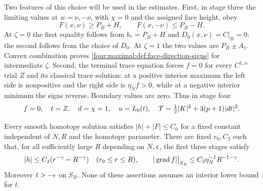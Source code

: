 Two features of this choice will be used in the estimates.
First, in stage three the limiting values at $w=\nu,-\nu$, with
$\chi=0$ and the assigned face height, obey
\begin{equation}\label{four:maximal:def:face-direction-signs}
 F(x,\nu)\ge P_B+H,\qquad F(x,-\nu)\le P_B-H.
\end{equation}
At $\zeta=0$ the first equality follows from $b_*=P_B+H$ and
$D_0(x,\nu)=C|_B=0$; the second follows from the choice of $D_0$.
At $\zeta=1$ the two values are $P_B\pm A_1$.  Convex combination proves
\eqref{four:maximal:def:face-direction-signs} for intermediate $\zeta$.
Second, the terminal trace equation forces $f=0$ for every
$C^{1,\alpha}$ trial $Z$ and its classical trace solution: at a positive interior maximum the left side is nonpositive and
the right side is $\eta_N f>0$, while at a negative interior minimum the
signs reverse.  Boundary values are zero.  Thus in stage four
\begin{equation}\label{four:maximal:def:terminal-reduction}
 f=0,\quad t=Z,\quad d=\chi=1,\quad u=L_0(t),\quad
 \mathcal T=\tfrac12|K|^2+3(p+1)|dt|^2.
\end{equation}

\begin{lemma}\label{four:maximal:lem:height-end}
Every smooth homotopy solution satisfies $|h|+|F|\le C_0$ for a fixed
constant independent of $N,R$ and the homotopy parameter.  There are
fixed $r_0,C_2$ such that, for all sufficiently large $R$ depending on
$N,\epsilon$, the first three stages satisfy
\begin{equation}\label{four:maximal:def:height-end}
 |h|\le C_2(r^{-\gamma}-R^{-\gamma})\quad(r_0\le r\le R),
 \qquad |\operatorname{grad} f|\big|_{S_R}\le C_3\eta_N^{-1}R^{-1-\gamma}.
\end{equation}
Moreover $t>-\epsilon$ on $S_R$.  None of these assertions assumes an
interior lower bound for $t$.
\end{lemma}

